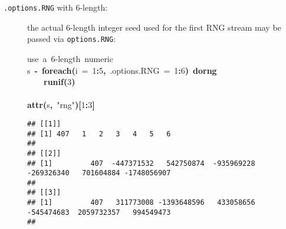 \documentclass[a4paper,12pt]{article}\usepackage{graphicx, color}
\makeatletter
\newcommand{\hlnumber}[1]{\textcolor[rgb]{0,0,0}{#1}}%
\newcommand{\hlfunctioncall}[1]{\textcolor[rgb]{0.501960784313725,0,0.329411764705882}{\textbf{#1}}}%
\newcommand{\hlstring}[1]{\textcolor[rgb]{0.6,0.6,1}{#1}}%
\newcommand{\hlkeyword}[1]{\textcolor[rgb]{0,0,0}{\textbf{#1}}}%
\newcommand{\hlargument}[1]{\textcolor[rgb]{0.690196078431373,0.250980392156863,0.0196078431372549}{#1}}%
\newcommand{\hlcomment}[1]{\textcolor[rgb]{0.180392156862745,0.6,0.341176470588235}{#1}}%
\newcommand{\hlassignement}[1]{\textcolor[rgb]{0,0,0}{\textbf{#1}}}%
\newcommand{\hlsymbol}[1]{\textcolor[rgb]{0,0,0}{#1}}%
\newcommand{\hlstd}[1]{\textcolor[rgb]{0,0,0}{#1}}%
\newenvironment{kframe}{%
 \def\FrameCommand##1{\hskip\@totalleftmargin \hskip-\fboxsep
 \colorbox{shadecolor}{##1}\hskip-\fboxsep
     \hskip-\linewidth \hskip-\@totalleftmargin \hskip\columnwidth}%
 \MakeFramed {\advance\hsize-\width
   \@totalleftmargin\z@ \linewidth\hsize
   \@setminipage}}%
 {\par\unskip\endMakeFramed}
\newenvironment{knitrout}{}{} %
\renewenvironment{knitrout}{\begin{footnotesize}}{\end{footnotesize}}
\let\code=\texttt
\makeatother
\begin{document}
\begin{description}
\item[\code{.options.RNG} with 6-length:] the actual 6-length integer seed used
for the first RNG stream may be passed via \code{options.RNG}: 
\begin{knitrout}
\color{fgcolor}\begin{kframe}
\begin{flushleft}
\ttfamily\noindent
\hlcomment{\usebox{\hlnormalsizeboxhash}{\ }use{\ }a{\ }6-length{\ }numeric}\hspace*{\fill}\\
\hlstd{}\hlsymbol{s}{\ }\hlassignement{\usebox{\hlnormalsizeboxlessthan}-}{\ }\hlfunctioncall{foreach}\hlkeyword{(}\hlargument{i}{\ }\hlargument{=}{\ }\hlnumber{1}\hlkeyword{:}\hlnumber{5}\hlkeyword{,}{\ }\hlargument{.options.RNG}{\ }\hlargument{=}{\ }\hlnumber{1}\hlkeyword{:}\hlnumber{6}\hlkeyword{)}{\ }\hlkeyword{\usebox{\hlnormalsizeboxpercent}dorng\usebox{\hlnormalsizeboxpercent}}{\ }\hlkeyword{\usebox{\hlnormalsizeboxopenbrace}}\hspace*{\fill}\\
\hlstd{}{\ }{\ }{\ }{\ }\hlfunctioncall{runif}\hlkeyword{(}\hlnumber{3}\hlkeyword{)}\hspace*{\fill}\\
\hlstd{}\hlkeyword{\usebox{\hlnormalsizeboxclosebrace}}\hspace*{\fill}\\
\hlstd{}\hlfunctioncall{attr}\hlkeyword{(}\hlsymbol{s}\hlkeyword{,}{\ }\hlstring{"{}rng"{}}\hlkeyword{)}\hlkeyword{[}\hlnumber{1}\hlkeyword{:}\hlnumber{3}\hlkeyword{]}\mbox{}
\normalfont
\end{flushleft}
\begin{verbatim}
## [[1]]
## [1] 407   1   2   3   4   5   6
## 
## [[2]]
## [1]         407  -447371532   542750874  -935969228  -269326340   701604884 -1748056907
## 
## [[3]]
## [1]         407   311773008 -1393648596   433058656  -545474683  2059732357   994549473
## 
\end{verbatim}
\end{kframe}
\end{knitrout}


\end{description}
\end{document}
